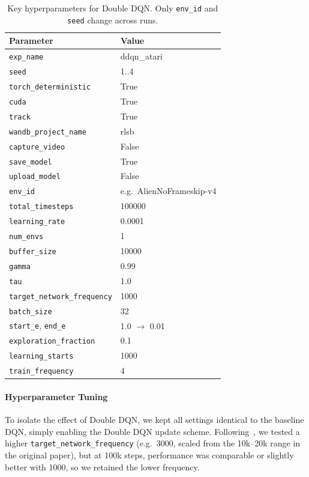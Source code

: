 \begin{table}
	\caption{Key hyperparameters for Double DQN. Only \texttt{env\_id} and \texttt{seed} change across runs.}
	\label{tab:ddqn_hyperparams}
	\centering
	\begin{tabular}{ll}
		\toprule
		\textbf{Parameter} & \textbf{Value} \\
		\midrule
		\texttt{exp\_name}                & ddqn\_atari \\
		\texttt{seed}                     & 1..4 \\
		\texttt{torch\_deterministic}     & True \\
		\texttt{cuda}                     & True \\
		\texttt{track}                    & True \\
		\texttt{wandb\_project\_name}     & rlsb \\
		\texttt{capture\_video}           & False \\
		\texttt{save\_model}              & True \\
		\texttt{upload\_model}            & False \\
		\texttt{env\_id}                  & e.g.\ AlienNoFrameskip-v4 \\
		\texttt{total\_timesteps}         & 100000 \\
		\texttt{learning\_rate}           & 0.0001 \\
		\texttt{num\_envs}                & 1 \\
		\texttt{buffer\_size}             & 10000 \\
		\texttt{gamma}                    & 0.99 \\
		\texttt{tau}                      & 1.0 \\
		\texttt{target\_network\_frequency} & 1000 \\
		\texttt{batch\_size}             & 32 \\
		\texttt{start\_e}, \texttt{end\_e} & 1.0 $\to$ 0.01 \\
		\texttt{exploration\_fraction}    & 0.1 \\
		\texttt{learning\_starts}         & 1000 \\
		\texttt{train\_frequency}         & 4 \\
		\bottomrule
	\end{tabular}
\end{table}

\paragraph{Hyperparameter Tuning}
To isolate the effect of Double DQN, we kept all settings identical to the baseline DQN, simply enabling the Double DQN update scheme. 
Following~\cite{van:double_q}, we tested a higher \texttt{target\_network\_frequency} (e.g.\ 3000, scaled from the 10k--20k range in the original paper), but at 100k steps, performance was comparable or slightly better with 1000, so we retained the lower frequency. 

